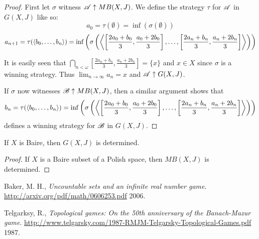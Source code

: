 \begin{proof}
  First let $\sigma$ witness $\mathscr{A}\uparrow MB(X,J)$. We define the strategy $\tau$
  for $\mathscr{A}$ in $G(X,J)$ like so:
    \[
      a_0 = \tau(\emptyset) = \inf(\sigma(\emptyset))
    \]
    \[
      a_{n+1} = \tau(\langle b_0,\dots,b_n\rangle) 
        = 
      \inf\left(\sigma\left(\left\langle
        \left[\frac{2a_0+b_0}{3},\frac{a_0+2b_0}{3}\right],
        \dots,
        \left[\frac{2a_n+b_n}{3},\frac{a_n+2b_n}{3}\right]
      \right\rangle\right)\right)
    \]

  It is easily seen that
    $
      \bigcap_{n<\omega}
      [\frac{2a_n+b_n}{3},\frac{a_n+2b_n}{3}]
        =
      \{x\}
    $
  and $x\in X$ since $\sigma$ is a winning strategy.
  Thus $\lim_{n\to\infty}a_n=x$ and $\mathscr{A}\uparrow G(X,J)$.

  If $\sigma$ now witnesses $\mathscr{B}\uparrow MB(X,J)$, then a similar argument shows
  that
    \[
      b_n = \tau(\langle b_0,\dots,b_n\rangle) 
        = 
      \inf\left(\sigma\left(\left\langle
        \left[\frac{2a_0+b_0}{3},\frac{a_0+2b_0}{3}\right],
        \dots,
        \left[\frac{2a_n+b_n}{3},\frac{a_n+2b_n}{3}\right]
      \right\rangle\right)\right)
    \]
  defines a winning strategy for $\mathscr{B}$ in $G(X,J)$.
\end{proof}

\begin{corollary}
  If $X$ is Baire, then $G(X,J)$ is determined.
\end{corollary}

\begin{proof}
  If $X$ is a Baire subset of a Polish space, then $MB(X,J)$ is determined.
\end{proof}

\newpage

\begin{thebibliography}{9}

  Baker, M. H.,
  \emph{Uncountable sets and an inﬁnite real number game}.
  \url{http://arxiv.org/pdf/math/0606253.pdf}
  2006.

  Telgarksy, R.,
  \emph{Topological games: On the 50th anniversary of the Banach-Mazur game}.
  \url{http://www.telgarsky.com/1987-RMJM-Telgarsky-Topological-Games.pdf}
  1987.

\end{thebibliography}





